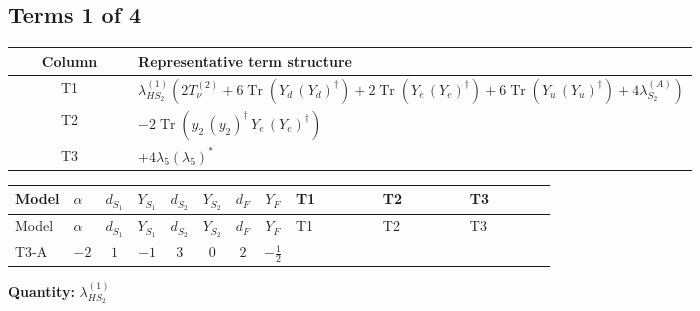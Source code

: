 \documentclass[8pt]{article}
\begin{document}
\begin{landscape}
\subsection*{Terms 1 of 4}
\begin{center}
\begin{tabular}{@{}c >{\raggedright\arraybackslash}p{0.82\linewidth}@{}}
\toprule
Column & Representative term structure \\
\midrule
T1 & \(\displaystyle {\lambda_{HS_2}^{(1)}} (2 T_{\nu}^{(2)}+6 \operatorname{Tr}\!\left({Y_d}\,\left({Y_d}\right)^{\dagger}\right)+2 \operatorname{Tr}\!\left({Y_e}\,\left({Y_e}\right)^{\dagger}\right)+6 \operatorname{Tr}\!\left({Y_u}\,\left({Y_u}\right)^{\dagger}\right)+4 {\lambda_{S_2}^{(A)}})\) \\
\midrule
T2 & \(\displaystyle -2 \operatorname{Tr}\!\left({y_2}\,\left({y_2}\right)^{\dagger}\,{Y_e}\,\left({Y_e}\right)^{\dagger}\right)\) \\
\midrule
T3 & \(\displaystyle +4 {\lambda_5} \left({\lambda_5}\right)^{*}\) \\
\midrule
\bottomrule
\end{tabular}
\end{center}
\smallskip
\tiny
\begin{longtable}{@{}llcccccc >{\raggedright\arraybackslash}p{0.21\linewidth} >{\raggedright\arraybackslash}p{0.21\linewidth} >{\raggedright\arraybackslash}p{0.21\linewidth}@{}}
\toprule
Model & $\alpha$ & $d_{S_1}$ & $Y_{S_1}$ & $d_{S_2}$ & $Y_{S_2}$ & $d_F$ & $Y_F$ & T1 & T2 & T3 \\
\midrule
\endfirsthead
\toprule
Model & $\alpha$ & $d_{S_1}$ & $Y_{S_1}$ & $d_{S_2}$ & $Y_{S_2}$ & $d_F$ & $Y_F$ & T1 & T2 & T3 \\
\midrule
\endhead
T3-A & $-2$ & $1$ & $-1$ & $3$ & $0$ & $2$ & $-\frac{1}{2}$ & \scriptsize\adjustbox{max width=\linewidth}{$\begin{gathered} {\lambda_{HS_2}^{(1)}} (2 T_{\nu}^{(2)}+6 \operatorname{Tr}\!\left({Y_d}\,\left({Y_d}\right)^{\dagger}\right)+2 \operatorname{Tr}\!\left({Y_e}\,\left({Y_e}\right)^{\dagger}\right)+6 \operatorname{Tr}\!\left({Y_u}\,\left({Y_u}\right)^{\dagger}\right)+4 {\lambda_{S_2}^{(A)}})\end{gathered}$} & \scriptsize\adjustbox{max width=\linewidth}{$\begin{gathered} -2 \operatorname{Tr}\!\left({y_2}\,\left({y_2}\right)^{\dagger}\,{Y_e}\,\left({Y_e}\right)^{\dagger}\right)\end{gathered}$} & \scriptsize\adjustbox{max width=\linewidth}{$\begin{gathered} +4 {\lambda_5} \left({\lambda_5}\right)^{*}\end{gathered}$} \\
\midrule
\bottomrule
\end{longtable}
\clearpage
\noindent\textbf{Quantity: }$\lambda_{HS_2}^{(1)}$\par\smallskip

\end{landscape}
\end{document}
